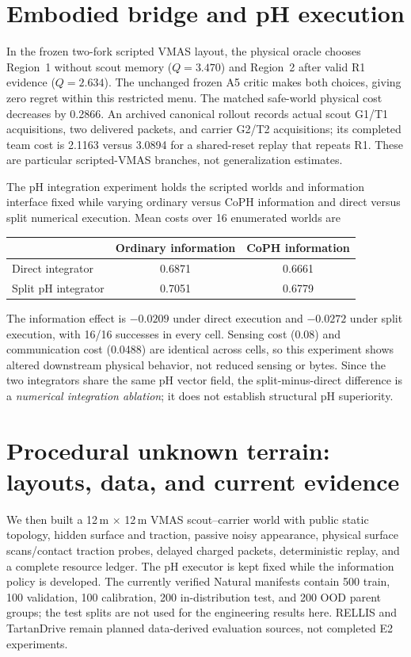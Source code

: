 \documentclass[10pt]{article}
\begin{document}
\section{Embodied bridge and pH execution}
In the frozen two-fork scripted VMAS layout, the physical oracle chooses
Region~1 without scout memory ($Q=3.470$) and Region~2 after valid R1
evidence ($Q=2.634$). The unchanged frozen A5 critic makes both choices,
giving zero regret within this restricted menu. The matched safe-world
physical cost decreases by 0.2866. An archived canonical rollout records
actual scout G1/T1 acquisitions, two delivered packets, and carrier G2/T2
acquisitions; its completed team cost is 2.1163 versus 3.0894 for a
shared-reset replay that repeats R1. These are particular scripted-VMAS
branches, not generalization estimates.

The pH integration experiment holds the scripted worlds and information
interface fixed while varying ordinary versus CoPH information and direct
versus split numerical execution. Mean costs over 16 enumerated worlds are
\begin{center}\small
\begin{tabular}{lcc}\toprule
& Ordinary information & CoPH information \\\midrule
Direct integrator & 0.6871 & 0.6661 \\
Split pH integrator & 0.7051 & 0.6779 \\\bottomrule
\end{tabular}
\end{center}
The information effect is $-0.0209$ under direct execution and $-0.0272$
under split execution, with 16/16 successes in every cell. Sensing cost
(0.08) and communication cost (0.0488) are identical across cells, so this
experiment shows altered downstream physical behavior, not reduced sensing
or bytes. Since the two integrators share the same pH vector field, the
split-minus-direct difference is a \emph{numerical integration ablation};
it does not establish structural pH superiority.

\section{Procedural unknown terrain: layouts, data, and current evidence}
We then built a 12\,m $\times$ 12\,m VMAS scout--carrier world with public
static topology, hidden surface and traction, passive noisy appearance,
physical surface scans/contact traction probes, delayed charged packets,
deterministic replay, and a complete resource ledger. The pH executor is
kept fixed while the information policy is developed. The currently verified
Natural manifests contain 500 train, 100 validation, 100 calibration, 200
in-distribution test, and 200 OOD parent groups; the test splits are not
used for the engineering results here. RELLIS and TartanDrive remain planned
data-derived evaluation sources, not completed E2 experiments.
\end{document}
